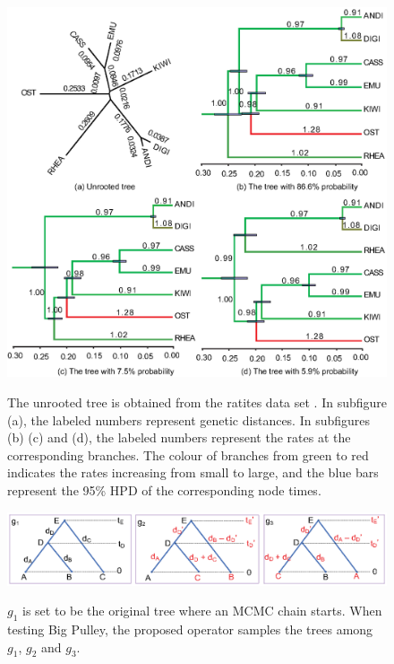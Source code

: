 \documentclass{bmcart}
\begin{document}
\begin{backmatter}
\begin{figure}[h!]
\includegraphics[width=12cm]{Fig17-fixedtree.eps}\\
\caption{
            The unrooted tree is obtained from the ratites data set \cite{cooper2001complete}. In subfigure (a), the labeled numbers represent genetic distances. In subfigures (b) (c) and (d), the labeled numbers represent the rates at the corresponding branches. The colour of branches from green to red indicates the rates increasing from small to large, and the blue bars represent the 95\% HPD of the corresponding node times.}
\label{withoutdata}
\end{figure}

\begin{figure}[h!]
\includegraphics[width=12cm]{Fig08-sampleprior.eps}\\
\caption{
             $g_1$ is set to be the original tree where an MCMC chain starts. When testing Big Pulley, the proposed operator samples the trees among $g_1$, $g_2$ and $g_3$.}
\label{sampleprior}
\end{figure}


\end{backmatter}
\end{document}
